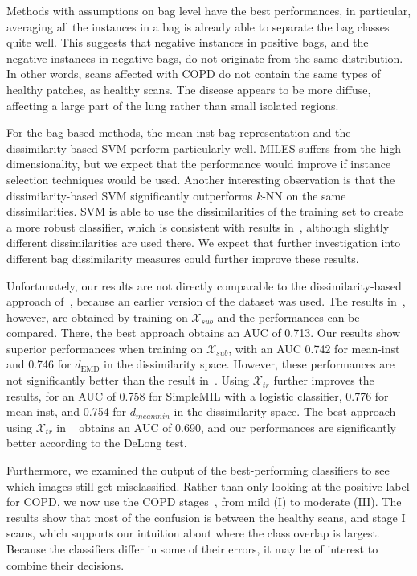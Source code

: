 \documentclass[10pt,conference,a4paper]{IEEEtran}
\begin{document}
Methods with assumptions on bag level have the best performances, in particular, averaging all the instances in a bag is already able to separate the bag classes quite well. This suggests that negative instances in positive bags, and the negative instances in negative bags, do not originate from the same distribution. In other words, scans affected with COPD do not contain the same types of healthy patches, as healthy scans. The disease appears to be more diffuse, affecting a large part of the lung rather than small isolated regions.

For the bag-based methods, the mean-inst bag representation and the dissimilarity-based SVM perform particularly well. MILES suffers from the high dimensionality, but we expect that the performance would improve if instance selection techniques would be used. Another interesting observation is that the dissimilarity-based SVM significantly outperforms $k$-NN on the same dissimilarities. SVM is able to use the dissimilarities of the training set to create a more robust classifier, which is consistent with results in~\cite{sorensen2010image}, although slightly different dissimilarities are used there. We expect that further investigation into different bag dissimilarity measures could further improve these results.

Unfortunately, our results are not directly comparable to the dissimilarity-based approach of~\cite{sorensen2010image}, because an earlier version of the dataset was used. The results in~\cite{sorensen2012texture}, however, are obtained by training on $\mathcal{X}_{sub}$ and the performances can be compared. There, the best approach obtains an AUC of 0.713. Our results show superior performances when training on $\mathcal{X}_{sub}$, with an AUC 0.742 for mean-inst and 0.746 for $d_{\text{EMD}}$ in the dissimilarity space. However, these performances are not significantly better than the result in~\cite{sorensen2012texture}. Using $\mathcal{X}_{tr}$ further improves the results, for an AUC of 0.758 for SimpleMIL with a logistic classifier, 0.776 for mean-inst, and 0.754 for $d_{meanmin}$ in the dissimilarity space. The best approach using $\mathcal{X}_{tr}$ in ~\cite{sorensen2012texture} obtains an AUC of 0.690, and our performances are significantly better according to the DeLong test. %


Furthermore, we examined the output of the best-performing classifiers to see which images still get misclassified. Rather than only looking at the positive label for COPD, we now use the COPD stages~\cite{rabe2007global}, from mild (I) to moderate (III). The results show that most of the confusion is between the healthy scans, and stage I scans, which supports our intuition about where the class overlap is largest. Because the classifiers differ in some of their errors, it may be of interest to combine their decisions.
\end{document}
